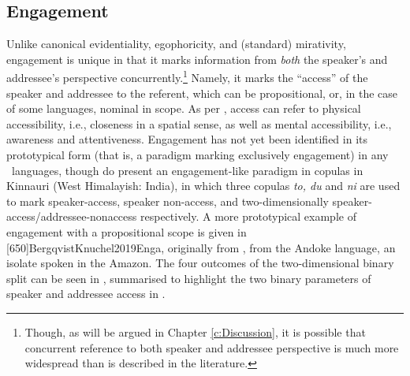 \subsection{Engagement}\label{s:Intro:EngagementIntro}
Unlike canonical evidentiality, egophoricity, and (standard) mirativity, engagement is unique in that it marks information from \textit{both} the speaker's and addressee's perspective concurrently.\footnote{Though, as will be argued in Chapter \ref{c:Discussion}, it is possible that concurrent reference to both speaker and addressee perspective is much more widespread than is described in the literature.} Namely, it marks the ``access'' \cite[118]{EvansBergqvistSanRoque2018a} of the speaker and addressee to the referent, which can be propositional, or, in the case of some languages, nominal in scope. As per , access can refer to physical accessibility, i.e., closeness in a spatial sense, as well as mental accessibility, i.e., awareness and attentiveness. Engagement has not yet been identified in its prototypical form (that is, a paradigm marking exclusively engagement) in any \lfam\ languages, though  do present an engagement-like paradigm in copulas in Kinnauri (West Himalayish: India), in which three copulas \textit{to, du} and \textit{ni} are used to mark speaker-access, speaker non-access, and two-dimensionally speaker-access/addressee-nonaccess respectively. A more prototypical example of engagement with a propositional scope is given in [650]{BergqvistKnuchel2019Enga}, originally from , from the Andoke language, an isolate spoken in the Amazon. The four outcomes of the two-dimensional binary split can be seen in , summarised to highlight the two binary parameters of speaker and addressee access in .

